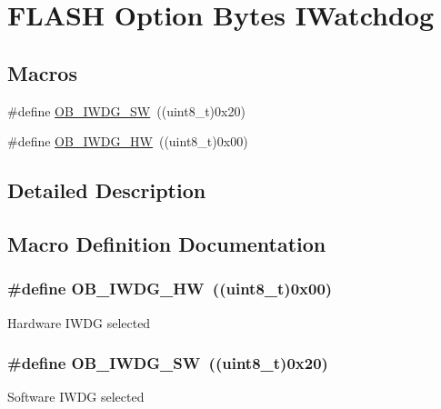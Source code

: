 \hypertarget{group___f_l_a_s_h_ex___option___bytes___i_watchdog}{}\section{F\+L\+A\+SH Option Bytes I\+Watchdog}
\label{group___f_l_a_s_h_ex___option___bytes___i_watchdog}
\subsection*{Macros}
\begin{DoxyCompactItemize}
\item 
\#define \hyperlink{group___f_l_a_s_h_ex___option___bytes___i_watchdog_ga5a357e232c955444c3f2ccb9a937ffce}{O\+B\+\_\+\+I\+W\+D\+G\+\_\+\+SW}~((uint8\+\_\+t)0x20)
\item 
\#define \hyperlink{group___f_l_a_s_h_ex___option___bytes___i_watchdog_gadfcbfa963d79c339ec8e2d5a7734e47a}{O\+B\+\_\+\+I\+W\+D\+G\+\_\+\+HW}~((uint8\+\_\+t)0x00)
\end{DoxyCompactItemize}


\subsection{Detailed Description}


\subsection{Macro Definition Documentation}
\subsubsection[{\texorpdfstring{O\+B\+\_\+\+I\+W\+D\+G\+\_\+\+HW}{OB_IWDG_HW}}]{\setlength{\rightskip}{0pt plus 5cm}\#define O\+B\+\_\+\+I\+W\+D\+G\+\_\+\+HW~((uint8\+\_\+t)0x00)}\hypertarget{group___f_l_a_s_h_ex___option___bytes___i_watchdog_gadfcbfa963d79c339ec8e2d5a7734e47a}{}\label{group___f_l_a_s_h_ex___option___bytes___i_watchdog_gadfcbfa963d79c339ec8e2d5a7734e47a}
Hardware I\+W\+DG selected 
\subsubsection[{\texorpdfstring{O\+B\+\_\+\+I\+W\+D\+G\+\_\+\+SW}{OB_IWDG_SW}}]{\setlength{\rightskip}{0pt plus 5cm}\#define O\+B\+\_\+\+I\+W\+D\+G\+\_\+\+SW~((uint8\+\_\+t)0x20)}\hypertarget{group___f_l_a_s_h_ex___option___bytes___i_watchdog_ga5a357e232c955444c3f2ccb9a937ffce}{}\label{group___f_l_a_s_h_ex___option___bytes___i_watchdog_ga5a357e232c955444c3f2ccb9a937ffce}
Software I\+W\+DG selected 